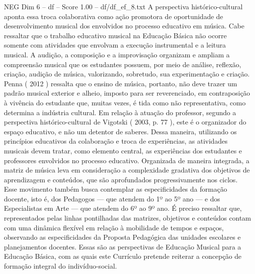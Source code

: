 \begin{textsample}{NEG Dim 6 – df – Score 1.00 – df/df\_ef\_8.txt}
A perspectiva histórico-cultural aponta essa troca colaborativa como ação promotora de oportunidade de desenvolvimento musical dos envolvidos no processo educativo em música.
Cabe ressaltar que o trabalho educativo musical na Educação Básica não ocorre somente com atividades que envolvam a execução instrumental e a leitura musical.
A audição, a composição e a improvisação organizam e ampliam a compreensão musical que os estudantes possuem, por meio de análise, reflexão, criação, audição de música, valorizando, sobretudo, sua experimentação e criação.
Penna ( 2012 ) ressalta que o ensino de música, portanto, não deve trazer um padrão musical exterior e alheio, imposto para ser reverenciado, em contraposição à vivência do estudante que, muitas vezes, é tida como não representativa, como determina a indústria cultural.
Em relação à atuação do professor, segundo a perspectiva histórico-cultural de Vigotski ( 2003, p. 77 ), este é o organizador do espaço educativo, e não um detentor de saberes.
Dessa maneira, utilizando os princípios educativos da colaboração e troca de experiências, as atividades musicais devem tratar, como elemento central, as experiências dos estudantes e professores envolvidos no processo educativo.
Organizada de maneira integrada, a matriz de música leva em consideração a complexidade gradativa dos objetivos de aprendizagem e conteúdos, que são aprofundados progressivamente nos ciclos.
Esse movimento também busca contemplar as especificidades da formação docente, isto é, dos Pedagogos — que atendem do 1º ao 5º ano — e dos Especialistas em Arte — que atendem do 6º ao 9º ano.
É preciso ressaltar que, representados pelas linhas pontilhadas das matrizes, objetivos e conteúdos contam com uma dinâmica flexível em relação à mobilidade de tempos e espaços, observando as especificidades da Proposta Pedagógica das unidades escolares e planejamentos docentes.
Essas são as perspectivas de Educação Musical para a Educação Básica, com as quais este Currículo pretende reiterar a concepção de formação integral do indivíduo-social.

\end{textsample}
